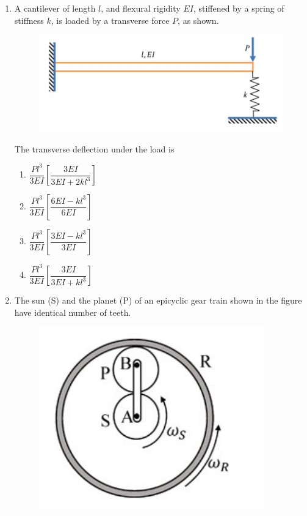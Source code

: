 \documentclass[12pt,onecolumn]{article}
\begin{document}
\begin{enumerate}
    \item A cantilever of length $l$, and flexural rigidity $EI$, stiffened by a spring of stiffness $k$, is loaded by a transverse force $P$, as shown.
          \begin{figure}[H]
              \centering
              \includegraphics[scale=0.5]{q28s2}
              \label{fig:q28s2}
          \end{figure}
          The transverse deflection under the load is
          \begin{enumerate}
              \item $\dfrac{P l^3}{3EI} \left[ \dfrac{3EI}{3EI + 2k l^3} \right]$
              \item $\dfrac{P l^3}{3EI} \left[ \dfrac{6EI - k l^3}{6EI} \right]$
              \item $\dfrac{P l^3}{3EI} \left[ \dfrac{3EI - k l^3}{3EI} \right]$
              \item $\dfrac{P l^3}{3EI} \left[ \dfrac{3EI}{3EI + k l^3} \right]$
          \end{enumerate}

    \item The sun (S) and the planet (P) of an epicyclic gear train shown in the figure have identical number of teeth.


          \begin{figure}[H]
              \centering
              \includegraphics[scale=0.4]{q29s2}
              \label{fig:q29s2}
          \end{figure}


\end{enumerate}
\end{document}
